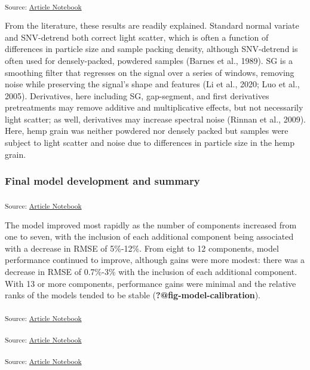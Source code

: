 \documentclass[
]{agujournal2019}
\begin{document}
\textsubscript{Source:
\href{https://rvcrawford.github.io/glowing-system/index.qmd.html}{Article
Notebook}}

From the literature, these results are readily explained. Standard
normal variate and SNV-detrend both correct light scatter, which is
often a function of differences in particle size and sample packing
density, although SNV-detrend is often used for densely-packed, powdered
samples (Barnes et al., 1989). SG is a smoothing filter that regresses
on the signal over a series of windows, removing noise while preserving
the signal's shape and features (Li et al., 2020; Luo et al., 2005).
Derivatives, here including SG, gap-segment, and first derivatives
pretreatments may remove additive and multiplicative effects, but not
necessarily light scatter; as well, derivatives may increase spectral
noise (Rinnan et al., 2009). Here, hemp grain was neither powdered nor
densely packed but samples were subject to light scatter and noise due
to differences in particle size in the hemp grain.

\subsubsection{Final model development and
summary}\label{final-model-development-and-summary}

\textsubscript{Source:
\href{https://rvcrawford.github.io/glowing-system/index.qmd.html}{Article
Notebook}}

The model improved most rapidly as the number of components increased
from one to seven, with the inclusion of each additional component being
associated with a decrease in RMSE of 5\%-12\%. From eight to 12
components, model performance continued to improve, although gains were
more modest: there was a decrease in RMSE of 0.7\%-3\% with the
inclusion of each additional component. With 13 or more components,
performance gains were minimal and the relative ranks of the models
tended to be stable (\textbf{?@fig-model-calibration}).

\label{cell-fig-model-calibration}
\textsubscript{Source:
\href{https://rvcrawford.github.io/glowing-system/index.qmd.html}{Article
Notebook}}

\textsubscript{Source:
\href{https://rvcrawford.github.io/glowing-system/index.qmd.html}{Article
Notebook}}

\textsubscript{Source:
\href{https://rvcrawford.github.io/glowing-system/index.qmd.html}{Article
Notebook}}
\end{document}
